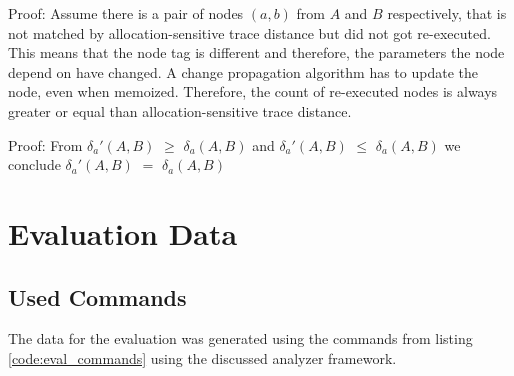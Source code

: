 \begin{lemma}
Proof: Assume there is a pair of nodes $(a, b)$ from $A$ and $B$ respectively, that is not matched by allocation-sensitive trace distance but did not got re-executed. This means that the node tag is different and therefore, the parameters the node depend on have changed. A change propagation algorithm has to update the node, even when memoized. Therefore, the count of re-executed nodes is always greater or equal than allocation-sensitive trace distance. 
\end{lemma}

\begin{theorem}[$\delta_a'(A, B)$ $=$ $\delta_a(A, B)$]
Proof: From $\delta_a'(A, B)$ $\ge$ $\delta_a(A, B)$ and $\delta_a'(A, B)$ $\le$ $\delta_a(A, B)$ we conclude $\delta_a'(A, B)$ $=$ $\delta_a(A, B)$ 
\end{theorem}

\section{Evaluation Data}
\label{app:tests}

\subsection{Used Commands}
The data for the evaluation was generated using the commands from listing \ref{code:eval_commands} using the discussed analyzer framework. 

